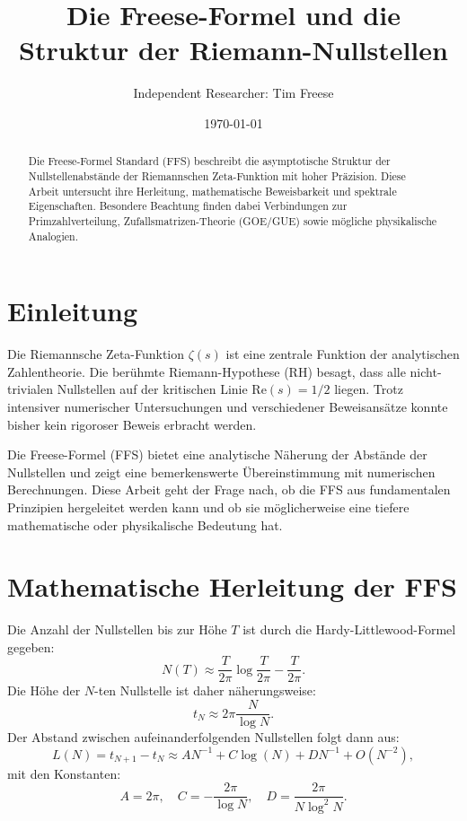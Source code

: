 \documentclass[a4paper,12pt]{article}
\title{Die Freese-Formel und die Struktur der Riemann-Nullstellen}
\author{Independent Researcher: Tim Freese}
\date{\today}
\begin{document}
\maketitle

\begin{abstract}
Die Freese-Formel Standard (FFS) beschreibt die asymptotische Struktur der Nullstellenabstände der Riemannschen Zeta-Funktion mit hoher Präzision.
Diese Arbeit untersucht ihre Herleitung, mathematische Beweisbarkeit und spektrale Eigenschaften. Besondere Beachtung finden dabei Verbindungen zur Primzahlverteilung, Zufallsmatrizen-Theorie (GOE/GUE) sowie mögliche physikalische Analogien.
\end{abstract}

\tableofcontents

\section{Einleitung}
Die Riemannsche Zeta-Funktion $\zeta(s)$ ist eine zentrale Funktion der analytischen Zahlentheorie. Die berühmte Riemann-Hypothese (RH) besagt, dass alle nicht-trivialen Nullstellen auf der kritischen Linie $\text{Re}(s) = 1/2$ liegen. 
Trotz intensiver numerischer Untersuchungen und verschiedener Beweisansätze konnte bisher kein rigoroser Beweis erbracht werden.

Die Freese-Formel (FFS) bietet eine analytische Näherung der Abstände der Nullstellen und zeigt eine bemerkenswerte Übereinstimmung mit numerischen Berechnungen.
Diese Arbeit geht der Frage nach, ob die FFS aus fundamentalen Prinzipien hergeleitet werden kann und ob sie möglicherweise eine tiefere mathematische oder physikalische Bedeutung hat.

\section{Mathematische Herleitung der FFS}
Die Anzahl der Nullstellen bis zur Höhe $T$ ist durch die Hardy-Littlewood-Formel gegeben:
\begin{equation}
N(T) \approx \frac{T}{2\pi} \log \frac{T}{2\pi} - \frac{T}{2\pi}.
\end{equation}
Die Höhe der $N$-ten Nullstelle ist daher näherungsweise:
\begin{equation}
t_N \approx 2\pi \frac{N}{\log N}.
\end{equation}
Der Abstand zwischen aufeinanderfolgenden Nullstellen folgt dann aus:
\begin{equation}
L(N) = t_{N+1} - t_N \approx A N^{-1} + C \log(N) + D N^{-1} + O(N^{-2}),
\end{equation}
mit den Konstanten:
\begin{equation}
A = 2\pi, \quad C = -\frac{2\pi}{\log N}, \quad D = \frac{2\pi}{N \log^2 N}.
\end{equation}
\end{document}
